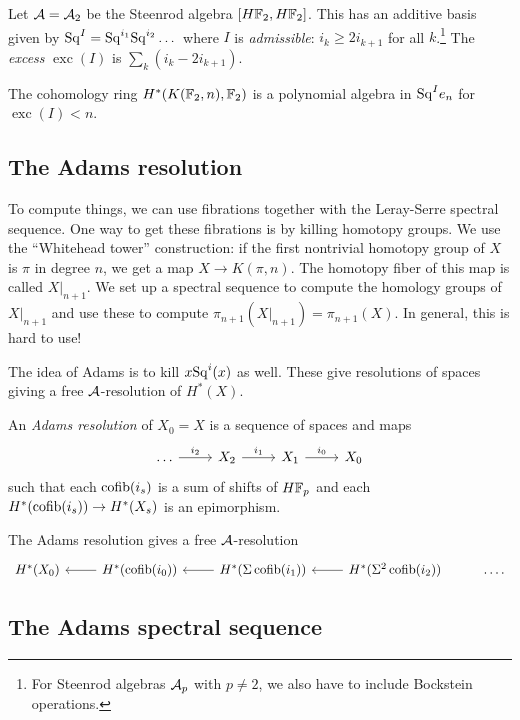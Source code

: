 \documentclass{article}
\begin{document}
Let $\mathcal{A} = \mathcal{A}_2$ be the Steenrod algebra $[H\mathbb{F}_2, H\mathbb{F}_2]$.
This has an additive basis given by $\mathrm{Sq}^I = \mathrm{Sq}^{i_1} \mathrm{Sq}^{i_2} \dots$ where $I$ is \emph{admissible}: $i_k \geq 2 i_{k+1}$ for all $k$.\footnote{For Steenrod algebras $\mathcal{A}_p$ with $p \neq 2$, we also have to include Bockstein operations.}
The \emph{excess} $\operatorname{exc}(I)$ is $\sum_k (i_k - 2 i_{k+1})$.

\begin{thm}[Serre]
	The cohomology ring $H^*(K(\mathbb{F}_2, n), \mathbb{F}_2)$ is a polynomial algebra in $\mathrm{Sq}^I e_n$ for $\operatorname{exc}(I) < n$.
\end{thm}

\subsection{The Adams resolution}

To compute things, we can use fibrations together with the Leray-Serre spectral sequence.
One way to get these fibrations is by killing homotopy groups.
We use the ``Whitehead tower'' construction: if the first nontrivial homotopy group of $X$ is $\pi$ in degree $n$, we get a map $X \to K(\pi, n)$.
The homotopy fiber of this map is called $X|_{n+1}$.
We set up a spectral sequence to compute the homology groups of $X|_{n+1}$ and use these to compute $\pi_{n+1}(X|_{n+1}) = \pi_{n+1}(X)$.
In general, this is hard to use!

The idea of Adams is to kill $x \mathrm{Sq}^i(x)$ as well.
These give resolutions of spaces giving a free $\mathcal{A}$-resolution of $H^*(X)$.

\begin{dfn}
	An \emph{Adams resolution} of $X_0 = X$ is a sequence of spaces and maps
	\[
		\begin{tikzcd}
			\dots \rar["i_2"] & X_2 \rar["i_1"] & X_1 \rar["i_0"] & X_0
		\end{tikzcd}
	\]
	such that each $\operatorname{cofib}(i_s)$ is a sum of shifts of $H\mathbb{F}_p$ and each $H^*(\operatorname{cofib}(i_s)) \to H^*(X_s)$ is an epimorphism.
\end{dfn}

The Adams resolution gives a free $\mathcal{A}$-resolution
\[
	\begin{tikzcd}
		H^*(X_0) & H^*(\cofib(i_0)) \lar & H^*(\Sigma \cofib(i_1)) \lar & H^*(\Sigma^2 \cofib(i_2)) \lar & \dots.
	\end{tikzcd}
\]

\subsection{The Adams spectral sequence}
\end{document}
